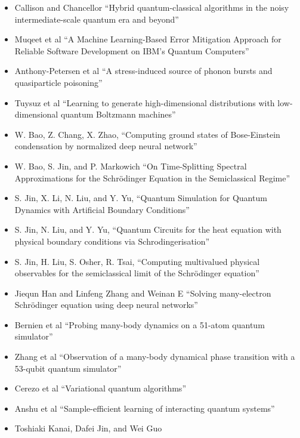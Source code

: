 \documentclass[]{article}
\begin{document}
\begin{itemize}
\item Callison and Chancellor\cite{callison2022hybrid} 
 ``Hybrid quantum-classical algorithms in the noisy intermediate-scale quantum era and beyond''
\item Muqeet et al\cite{muqeet2024machine}
``A Machine Learning-Based Error Mitigation Approach for Reliable Software Development on IBM’s Quantum Computers''
\item Anthony-Petersen et al\cite{anthony2024stress}
``A stress-induced source of phonon bursts and quasiparticle poisoning''
\item Tuysuz et al\cite{tuysuz2024learning}
  ``Learning to generate high-dimensional distributions with low-dimensional quantum Boltzmann machines''
\item W. Bao, Z. Chang, X. Zhao\cite{BAO2025113486}, ``Computing ground states of Bose-Einstein condensation by normalized deep neural network''
\item W. Bao, S. Jin, and P. Markowich\cite{BAO2002487}
``On Time-Splitting Spectral Approximations for the Schrödinger Equation in the Semiclassical Regime''
\item S. Jin, X. Li, N. Liu, and Y. Yu\cite{doi:10.1137/23M1563451},
 ``Quantum Simulation for Quantum Dynamics with Artificial Boundary 
Conditions''
\item S. Jin, N. Liu, and Y. Yu\cite{jin2024quantum}, ``Quantum Circuits for the heat equation with physical boundary conditions via Schrodingerisation''
\item S. Jin, H. Liu, S. Osher, R. Tsai\cite{jin2005computing}, ``Computing multivalued physical observables for the semiclassical limit of the Schr{\"o}dinger equation''
\item
Jiequn Han and Linfeng Zhang and Weinan E\cite{HAN2019108929}
``Solving many-electron Schrödinger equation using deep neural networks''
\item
Bernien et al\cite{bernien2017probing}
``Probing many-body dynamics on a 51-atom quantum simulator''
\item
Zhang et al\cite{zhang2017observation}
``Observation of a many-body dynamical phase transition with a 53-qubit quantum simulator''
\item 
Cerezo et al\cite{cerezo2021variational}
``Variational quantum algorithms''
\item
Anshu et al\cite{anshu2021sample}
``Sample-efficient learning of interacting quantum systems''
\item
Toshiaki Kanai, Dafei Jin, and Wei Guo\cite{PhysRevLett.132.250603}

\end{itemize}
\end{document}
